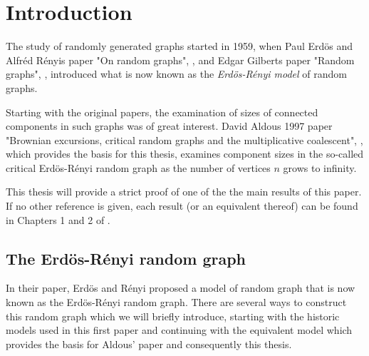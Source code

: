 
\chapter{Introduction}

The study of randomly generated graphs started in 1959,
when Paul Erdös and Alfréd Rényis paper "On random graphs", \cite{Erdos.1959},
and Edgar Gilberts paper "Random graphs", \cite{Gilbert.1959},
introduced what is now known as the \emph{Erdös-Rényi model} of random graphs.

Starting with the original papers,
the examination of sizes of connected components in such graphs was of great interest.
David Aldous 1997 paper "Brownian excursions, critical random graphs and the multiplicative coalescent", \cite{Aldous.1997},
which provides the basis for this thesis,
examines component sizes in the so-called critical Erdös-Rényi random graph as the number of vertices $n$ grows to infinity.

This thesis will provide a strict proof of one of the the main results of this paper.
If no other reference is given, each result (or an equivalent thereof) can be found in Chapters 1 and 2 of \cite{Aldous.1997}.


\section{The Erdös-Rényi random graph}

In their paper, Erdös and Rényi proposed a model of random graph that is now known as the Erdös-Rényi random graph.
There are several ways to construct this random graph which we will briefly introduce,
starting with the historic models used in this first paper 
and continuing with the equivalent model which provides the basis for Aldous' paper and consequently this thesis.

